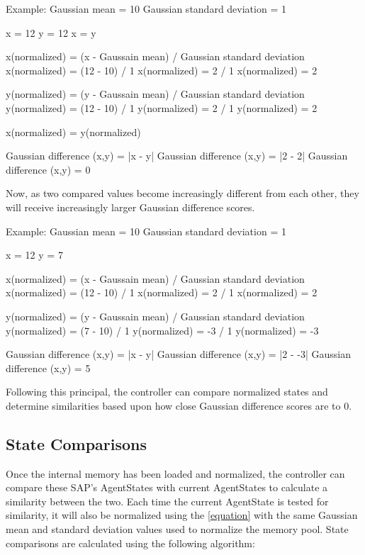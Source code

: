 \begin{listings}
Example:
Gaussian mean = 10
Gaussian standard deviation = 1

x = 12
y = 12
x = y

x(normalized) = (x - Gaussain mean) / Gaussian standard deviation
x(normalized) = (12 - 10) / 1
x(normalized) = 2 / 1
x(normalized) = 2

y(normalized) = (y - Gaussain mean) / Gaussian standard deviation
y(normalized) = (12 - 10) / 1
y(normalized) = 2 / 1
y(normalized) = 2

x(normalized) = y(normalized)

Gaussian difference (x,y) = |x - y|
Gaussian difference (x,y) = |2 - 2|
Gaussian difference (x,y) = 0
\end{listings}

Now, as two compared values become increasingly different from each other, they will receive increasingly larger Gaussian difference scores.

\begin{listings}
Example:
Gaussian mean = 10
Gaussian standard deviation = 1

x = 12
y = 7

x(normalized) = (x - Gaussain mean) / Gaussian standard deviation
x(normalized) = (12 - 10) / 1
x(normalized) = 2 / 1
x(normalized) = 2

y(normalized) = (y - Gaussain mean) / Gaussian standard deviation
y(normalized) = (7 - 10) / 1
y(normalized) = -3 / 1
y(normalized) = -3

Gaussian difference (x,y) = |x - y|
Gaussian difference (x,y) = |2 - -3|
Gaussian difference (x,y) = 5
\end{listings}

Following this principal, the controller can compare normalized states and determine similarities based upon how close Gaussian difference scores are to 0.


\subsection{State Comparisons}
Once the internal memory has been loaded and normalized, the controller can compare these SAP's AgentStates with current AgentStates to calculate a similarity between the two.
Each time the current AgentState is tested for similarity, it will also be normalized using the \ref{equation} with the same Gaussian mean and standard deviation values used to normalize the memory pool.
State comparisons are calculated using the following algorithm:

